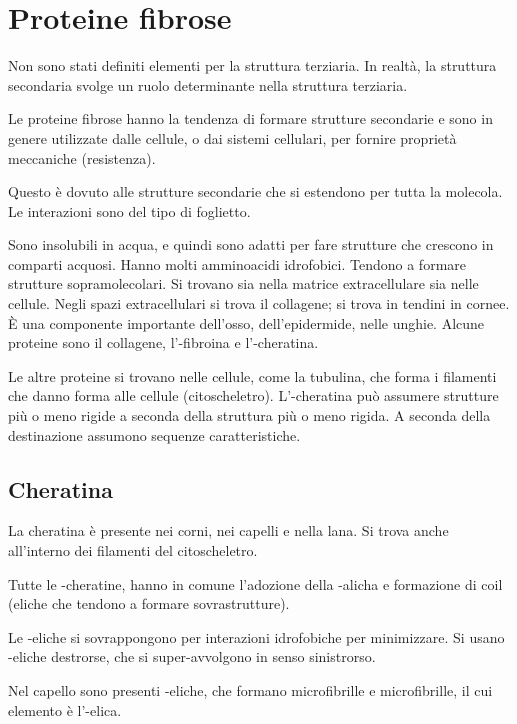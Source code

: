 \chapter{Proteine fibrose}


Non sono stati definiti elementi per la struttura terziaria. In realtà,
la struttura secondaria svolge un ruolo determinante nella struttura
terziaria.

Le proteine fibrose hanno la tendenza di formare strutture secondarie e
sono in genere utilizzate dalle cellule, o dai sistemi cellulari, per fornire
proprietà meccaniche (resistenza).

Questo è dovuto alle strutture secondarie che si estendono per tutta la
molecola. Le interazioni sono del tipo di foglietto.

Sono insolubili in acqua, e quindi sono adatti per fare strutture che
crescono in comparti acquosi. Hanno molti amminoacidi idrofobici.
Tendono a formare strutture sopramolecolari. Si trovano sia nella
matrice extracellulare sia nelle cellule. Negli spazi extracellulari si
trova il collagene; si trova in tendini in cornee. È una componente
importante dell'osso, dell'epidermide, nelle unghie.
Alcune proteine sono il collagene, l'\alpha-fibroina e l'\alpha-cheratina.

Le altre proteine si trovano nelle cellule, come la tubulina, che forma i filamenti che
danno forma alle cellule (citoscheletro). L'\alpha-cheratina può assumere
strutture più o meno rigide a seconda della struttura più o meno rigida.
A seconda della destinazione assumono sequenze caratteristiche.

\section{Cheratina}

La cheratina è presente nei corni, nei capelli e nella lana. Si trova anche
all'interno dei filamenti del citoscheletro.

Tutte le \alpha-cheratine, hanno in comune l'adozione della \alpha-alicha e
formazione di coil (eliche che tendono a formare sovrastrutture).

Le \alpha-eliche si sovrappongono per interazioni idrofobiche per
minimizzare. Si usano \alpha-eliche destrorse, che si super-avvolgono in
senso sinistrorso.

Nel capello sono presenti \alpha-eliche, che formano microfibrille e
microfibrille, il cui elemento è l'\alpha-elica.

